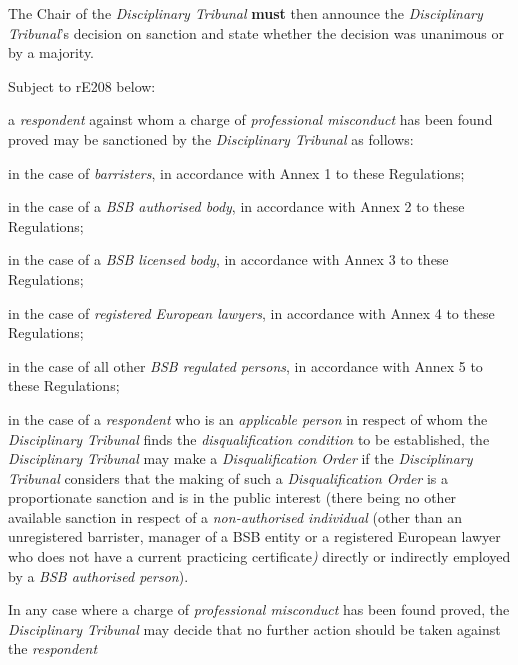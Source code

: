 \par
The Chair of the \emph{Disciplinary Tribunal}  \textcolor{myred}{\textbf{must}} then announce
the \emph{Disciplinary Tribunal}'s decision on sanction and state
whether the decision was unanimous or by a majority.\\
\par
Subject to rE208 below:\\\nl \item a \emph{respondent} against whom a charge of \emph{professional
misconduct} has been found proved may be sanctioned by
the \emph{Disciplinary Tribunal} as follows:
\al
\item in the case of \emph{barristers}, in accordance with Annex 1 to these
Regulations;\\
\item in the case of a \emph{BSB authorised body}, in accordance with Annex
2 to these Regulations;
\item in the case of a \emph{BSB licensed body}, in accordance with Annex 3
to these Regulations;\\
\item in the case of \emph{registered European lawyers}, in accordance with
Annex 4 to these Regulations;\\
\item in the case of all other \emph{BSB regulated persons}, in accordance
with Annex 5 to these Regulations;\la\item in the case of a \emph{respondent} who is an \emph{applicable
person} in respect of whom the \emph{Disciplinary Tribunal} finds
the \emph{disqualification condition} to be established,
the \emph{Disciplinary Tribunal} may make a \emph{Disqualification
Order} if the \emph{Disciplinary Tribunal} considers that the making of
such a \emph{Disqualification Order} is a proportionate sanction and is
in the public interest (there being no other available sanction in
respect of a \emph{non-authorised individual }(other than an
unregistered barrister, manager of a BSB entity or a registered European
lawyer who does not have a current practicing
certificate\emph{)} directly or indirectly employed by a \emph{BSB
authorised person}).\ln
{}\par
In any case where a charge of \emph{professional misconduct} has been
found proved, the \emph{Disciplinary Tribunal} may decide that no
further action should be taken against the \emph{respondent}\par
